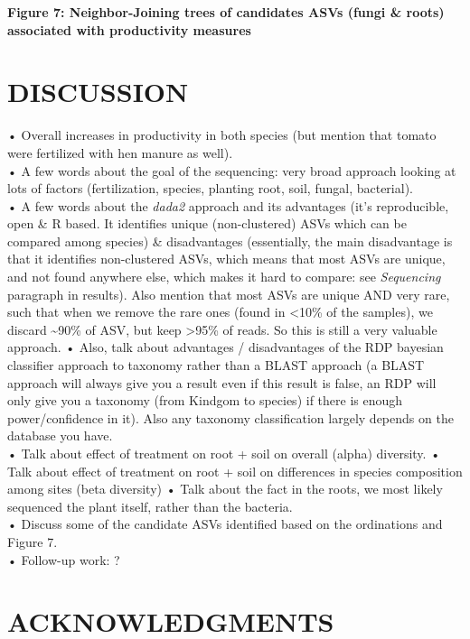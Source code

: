 \documentclass[11pt,]{article}
\begin{document}
\textbf{Figure 7: Neighbor-Joining trees of candidates ASVs (fungi \&
roots) associated with productivity measures} ~\\
\hspace*{0.333em}

\newpage  

\section{DISCUSSION}\label{discussion}

• Overall increases in productivity in both species (but mention that
tomato were fertilized with hen manure as well).\\
• A few words about the goal of the sequencing: very broad approach
looking at lots of factors (fertilization, species, planting root, soil,
fungal, bacterial).\\
• A few words about the \emph{dada2} approach and its advantages (it's
reproducible, open \& R based. It identifies unique (non-clustered) ASVs
which can be compared among species) \& disadvantages (essentially, the
main disadvantage is that it identifies non-clustered ASVs, which means
that most ASVs are unique, and not found anywhere else, which makes it
hard to compare: see \emph{Sequencing} paragraph in results). Also
mention that most ASVs are unique AND very rare, such that when we
remove the rare ones (found in \textless{}10\% of the samples), we
discard \textasciitilde{}90\% of ASV, but keep \textgreater{}95\% of
reads. So this is still a very valuable approach. • Also, talk about
advantages / disadvantages of the RDP bayesian classifier approach to
taxonomy rather than a BLAST approach (a BLAST approach will always give
you a result even if this result is false, an RDP will only give you a
taxonomy (from Kindgom to species) if there is enough power/confidence
in it). Also any taxonomy classification largely depends on the database
you have.\\
• Talk about effect of treatment on root + soil on overall (alpha)
diversity. • Talk about effect of treatment on root + soil on
differences in species composition among sites (beta diversity) • Talk
about the fact in the roots, we most likely sequenced the plant itself,
rather than the bacteria.\\
• Discuss some of the candidate ASVs identified based on the ordinations
and Figure 7.\\
• Follow-up work: ?

\section{ACKNOWLEDGMENTS}\label{acknowledgments}
\end{document}
